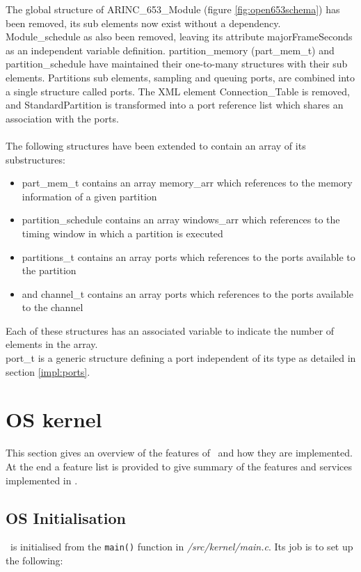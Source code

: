 The global structure of ARINC\_653\_Module (figure \ref{fig:open653schema}) has been removed,
its sub elements now exist without a dependency.
Module\_schedule as also been removed, leaving its attribute majorFrameSeconds as an independent variable definition.
partition\_memory (part\_mem\_t) and partition\_schedule have maintained their one-to-many structures with their sub elements.
Partitions\textquotesingle{} sub elements, sampling and queuing ports, are combined into a single structure called ports.
The XML element Connection\_Table is removed, and StandardPartition is
transformed into a port reference list which shares an association with the ports.
\\\\
The following structures have been extended to contain an array of its substructures:
\begin{itemize}
	\item part\_mem\_t contains an array memory\_arr which references to the memory information of a given partition
	\item partition\_schedule contains an array windows\_arr which references to the timing window in which a partition is executed
	\item partitions\_t contains an array ports which references to the ports available to the partition
	\item and channel\_t contains an array ports which references to the ports available to the channel
\end{itemize}

Each of these structures has an associated variable to indicate the number of elements in the array.\\

port\_t is a generic structure defining a port independent of its type as
detailed in section \ref{impl:ports}.


\section{OS kernel}
This section gives an overview of the features of \OSname\ and how they are
implemented. At the end a feature list is provided to give summary of the features
and services implemented in \OSname{}.


\subsection{OS Initialisation}
\OSname\ is initialised from the \texttt{main()} function in \textit{/src/kernel/main.c}.
Its job is to set up the following:

